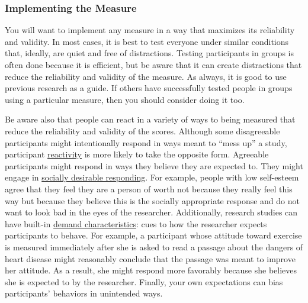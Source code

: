 \documentclass[
]{krantz}
\begin{document}
\hypertarget{implementing-the-measure}{%
\subsubsection*{Implementing the Measure}\label{implementing-the-measure}}


You will want to implement any measure in a way that maximizes its reliability and validity. In most cases, it is best to test everyone under similar conditions that, ideally, are quiet and free of distractions. Testing participants in groups is often done because it is efficient, but be aware that it can create distractions that reduce the reliability and validity of the measure. As always, it is good to use previous research as a guide. If others have successfully tested people in groups using a particular measure, then you should consider doing it too.

Be aware also that people can react in a variety of ways to being measured that reduce the reliability and validity of the scores. Although some disagreeable participants might intentionally respond in ways meant to ``mess up'' a study, participant \protect\hyperlink{reactivity}{reactivity} is more likely to take the opposite form. Agreeable participants might respond in ways they believe they are expected to. They might engage in \protect\hyperlink{socially-desirable-responding}{socially desirable responding}. For example, people with low self-esteem agree that they feel they are a person of worth not because they really feel this way but because they believe this is the socially appropriate response and do not want to look bad in the eyes of the researcher. Additionally, research studies can have built-in \protect\hyperlink{demand-characteristics}{demand characteristics}: cues to how the researcher expects participants to behave. For example, a participant whose attitude toward exercise is measured immediately after she is asked to read a passage about the dangers of heart disease might reasonably conclude that the passage was meant to improve her attitude. As a result, she might respond more favorably because she believes she is expected to by the researcher. Finally, your own expectations can bias participants' behaviors in unintended ways.
\end{document}
